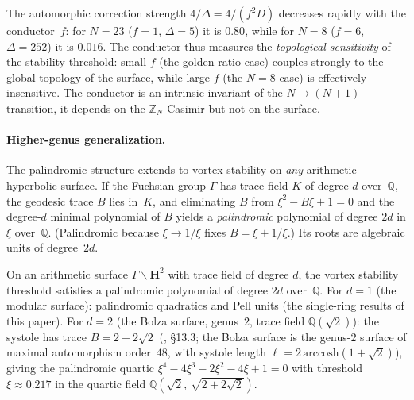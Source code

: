 \begin{remark}
\label{rmk:conductor-sensitivity}
The automorphic correction strength $4/\Delta = 4/(f^2 D)$
decreases rapidly with the conductor~$f$:
for $N = 23$ ($f = 1$, $\Delta = 5$) it is $0.80$, while
for $N = 8$ ($f = 6$, $\Delta = 252$) it is $0.016$.
The conductor thus measures the
\emph{topological sensitivity} of the stability threshold:
small $f$ (the golden ratio case) couples strongly to the
global topology of the surface, while large $f$ (the $N = 8$
case) is effectively insensitive.
The conductor is an intrinsic invariant of the $N \to (N{+}1)$
transition, it depends on the $\mathbb{Z}_N$ Casimir but not
on the surface.
\end{remark}

\paragraph{Higher-genus generalization.}
The palindromic structure extends to vortex stability on
\emph{any} arithmetic hyperbolic surface.
If the Fuchsian group $\Gamma$ has trace field $K$ of degree $d$
over~$\mathbb{Q}$, the geodesic trace $B$ lies in~$K$, and
eliminating $B$ from $\xi^2 - B\xi + 1 = 0$ and the degree-$d$
minimal polynomial of $B$ yields a \emph{palindromic} polynomial
of degree $2d$ in $\xi$ over~$\mathbb{Q}$.
(Palindromic because $\xi \to 1/\xi$ fixes $B = \xi + 1/\xi$.)
Its roots are algebraic units of degree~$2d$.

\begin{conjecture}
\label{conj:higher-genus}
On an arithmetic surface $\Gamma\backslash\mathbf{H}^2$ with
trace field of degree $d$, the vortex stability threshold
satisfies a palindromic polynomial of degree $2d$
over~$\mathbb{Q}$.
For $d = 1$ (the modular surface): palindromic quadratics
and Pell units (the single-ring results of this paper).
For $d = 2$ (the Bolza surface, genus~$2$, trace field
$\mathbb{Q}(\sqrt{2})$): the systole has trace
$B = 2 + 2\sqrt{2}$
(\citealt{Buser1992}, \S13.3; the Bolza surface is the
genus-$2$ surface of maximal automorphism order~$48$, with
systole length $\ell = 2\,\mathrm{arccosh}(1{+}\sqrt{2})$),
giving the palindromic quartic
$\xi^4 - 4\xi^3 - 2\xi^2 - 4\xi + 1 = 0$
with threshold $\xi \approx 0.217$ in the quartic field
$\mathbb{Q}(\sqrt{2},\,\sqrt{2{+}2\sqrt{2}})$.
\end{conjecture}

